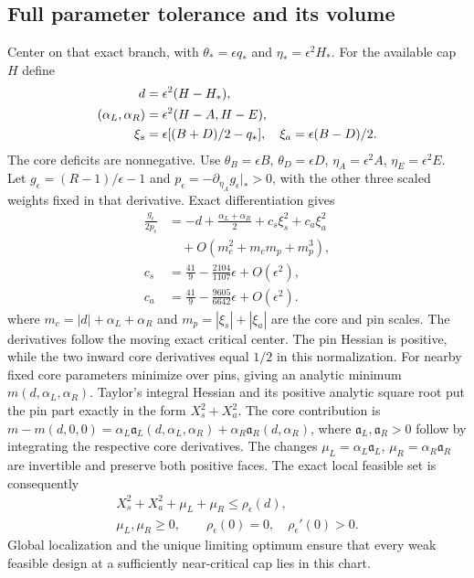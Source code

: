 \documentclass[aps,pre,reprint,amsmath,amssymb,longbibliography]{revtex4-2}
\begin{document}
\subsection{Full parameter tolerance and its volume}
\label{v3-app-full-tolerance}
Center on that exact branch, with $\theta_*=\epsilon q_*$ and
$\eta_*=\epsilon^2H_*$. For the available cap $H$ define
 \begin{align}
 d&=\epsilon^2(H-H_*),\notag\\
 (\alpha_L,\alpha_R)&=\epsilon^2(H-A,H-E), \label{v3-eq-full-tolerance-coordinates}\\
 \xi_s&=\epsilon[(B+D)/2-q_*],\quad
 \xi_a=\epsilon(B-D)/2.\notag
 \end{align}
The core deficits are nonnegative. Use
$\theta_B=\epsilon B$, $\theta_D=\epsilon D$,
$\eta_A=\epsilon^2A$, $\eta_E=\epsilon^2E$. Let
$g_\epsilon=(R-1)/\epsilon-1$ and
$p_\epsilon=-\partial_{\eta_A}g_\epsilon|_*>0$,
with the other three scaled weights fixed in that derivative.
Exact differentiation gives
\begin{equation}
 \begin{aligned}
 \frac{g_\epsilon}{2p_\epsilon}
 &=-d+\frac{\alpha_L+\alpha_R}{2}+c_s\xi_s^2+c_a\xi_a^2\\
 &\quad+O(m_c^2+m_cm_p+m_p^3),\\
 c_s&=\frac{41}{9}-\frac{2104}{1107}\epsilon+O(\epsilon^2),\\
 c_a&=\frac{41}{9}-\frac{9605}{6642}\epsilon+O(\epsilon^2).
 \end{aligned}
 \label{v3-eq-full-tolerance-jet}
\end{equation}
where $m_c=|d|+\alpha_L+\alpha_R$ and $m_p=|\xi_s|+|\xi_a|$ are the core and pin scales.
The derivatives follow the moving exact critical center. The pin Hessian is
positive, while the two inward core derivatives equal $1/2$ in this
normalization. For nearby fixed core parameters minimize over pins, giving
an analytic minimum $m(d,\alpha_L,\alpha_R)$. Taylor's integral Hessian
and its positive analytic square root put the pin part exactly in the form
$X_s^2+X_a^2$. The core contribution is
$m-m(d,0,0)=\alpha_L\mathfrak a_L(d,\alpha_L,\alpha_R)+\alpha_R\mathfrak a_R(d,\alpha_R)$,
where $\mathfrak a_L,\mathfrak a_R>0$ follow by integrating the respective core derivatives.
The changes $\mu_L=\alpha_L\mathfrak a_L$, $\mu_R=\alpha_R\mathfrak a_R$ are invertible and
preserve both positive faces. The exact local feasible set is consequently
\begin{equation}
 \begin{gathered}
 X_s^2+X_a^2+\mu_L+\mu_R\le\rho_\epsilon(d),\\
 \mu_L,\mu_R\ge0,\qquad\rho_\epsilon(0)=0,\quad\rho_\epsilon'(0)>0.
 \end{gathered}
 \label{v3-eq-exact-morse-corner}
\end{equation}
Global localization and the unique limiting optimum ensure that every weak
feasible design at a sufficiently near-critical cap lies in this chart.
\end{document}
